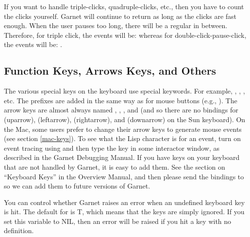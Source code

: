 If you want to handle triple-clicks, quadruple-clicks, etc., then you
have to count the clicks yourself.  Garnet will continue to return
 as long as the clicks are fast enough.  When the user
pauses too long, there will be a regular  in between.
Therefore, for triple click, the events will be: 
whereas for double-click-pause-click, the events will be:
.


\subsection{Function Keys, Arrows Keys, and Others}

The various special keys on the keyboard use special keywords.
For example, , , , etc.
The prefixes are added in the same way as for mouse buttons (e.g.,
).  The arrow keys
are almost always named , , , and
 (and so there are no bindings for  (uparrow),
 (leftarrow),  (rightarrow), and  (downarrow) on
the Sun keyboard).  On the Mac, some users prefer to change their
arrow keys to generate mouse events (see section \ref{mac-keys}).
To see what the Lisp character is for an event, turn on event tracing using
 and then type the key in some interactor
window, as described in the Garnet Debugging Manual.
If you have keys on your keyboard that are not handled by Garnet, it is
easy to add them.  See the section on ``Keyboard Keys'' in the Overview
Manual, and then please send the bindings to 
so we can add them to future versions of Garnet.

You can control whether Garnet raises an error when an undefined keyboard
key is hit.  The default for  is T,
which means that the keys are simply ignored.  If you set this variable to
NIL, then an error will be raised if you hit a key with no definition.


